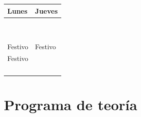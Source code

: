 \documentclass[a4paper,12pt]{article}
\begin{document}
\newcommand{\juevesA}{29 de enero}
\newcommand{\juevesB}{5 de febrero}
\newcommand{\juevesC}{12 de febrero}
\newcommand{\juevesD}{19 de febrero}
\newcommand{\juevesE}{26 de febrero}
\newcommand{\juevesF}{5 de marzo}
\newcommand{\juevesG}{12 de marzo}
\newcommand{\juevesH}{19 de marzo}
\newcommand{\juevesI}{26 de marzo}
\newcommand{\juevesJ}{9 de abril}
\newcommand{\juevesK}{16 de abril}
\newcommand{\juevesL}{23 de abril}
\newcommand{\juevesM}{30 de abril}
\newcommand{\juevesN}{7 de mayo}

\begin{tabular}{|l|l|}
   \hline
  Lunes & Jueves \\ \hline \hline
  \nameref{cal:lunesAa} & \nameref{cal:juevesA} \\ \hline
  \nameref{cal:lunesA} & \nameref{cal:juevesB} \\ \hline
  \nameref{cal:lunesB} & \nameref{cal:juevesC} \\ \hline  
  \nameref{cal:lunesC} & \nameref{cal:juevesD} \\ \hline
  \nameref{cal:lunesD} & \nameref{cal:juevesE} \\ \hline
  \nameref{cal:lunesE} & \nameref{cal:juevesF} \\ \hline
  \nameref{cal:lunesF} & \nameref{cal:juevesG} \\ \hline
  \nameref{cal:lunesG} & \nameref{cal:juevesH} \\ \hline
  \nameref{cal:lunesH} & \nameref{cal:juevesI} \\ \hline
  Festivo              & Festivo               \\ \hline
  Festivo              & \nameref{cal:juevesJ} \\ \hline 
  \nameref{cal:lunesI} & \nameref{cal:juevesK} \\ \hline
  \nameref{cal:lunesJ} & \nameref{cal:juevesL} \\ \hline
  \nameref{cal:lunesK} & \nameref{cal:juevesM} \\ \hline
  \nameref{cal:lunesL} & \nameref{cal:juevesN} \\ \hline
\end{tabular}

\newpage

\section{Programa de teoría}
\end{document}
